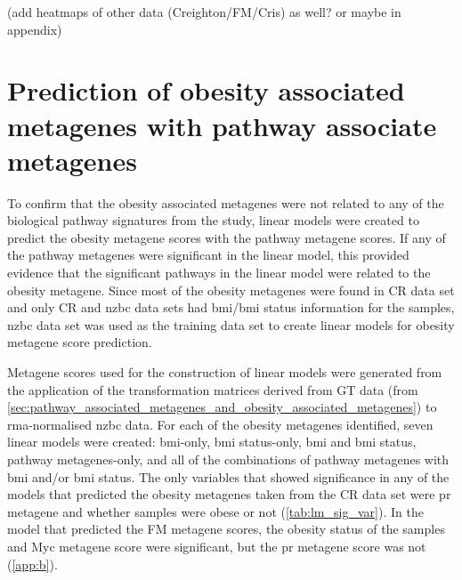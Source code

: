 (add heatmaps of other data (Creighton/FM/Cris) as well? or maybe in appendix)

\section{Prediction of obesity associated metagenes with pathway associate metagenes}
\label{sec:prediction_of_obesity_associated_metagene_with_pathway_associate_metagene}


To confirm that the obesity associated metagenes were not related to any of the biological pathway signatures from the \citet{Gatza2010a} study, linear models were created to predict the obesity metagene scores with the pathway metagene scores.
If any of the pathway metagenes were significant in the linear model, this provided evidence that the significant pathways in the linear model were related to the obesity metagene.
Since most of the obesity metagenes were found in CR data set and only CR and \gls{nzbc} data sets had \gls{bmi}/\gls{bmi} status information for the samples, \gls{nzbc} data set was used as the training data set to create linear models for obesity metagene score prediction.

Metagene scores used for the construction of linear models were generated from the application of the transformation matrices derived from GT data (from \cref{sec:pathway_associated_metagenes_and_obesity_associated_metagenes}) to \gls{rma}-normalised \gls{nzbc} data.
For each of the obesity metagenes identified, seven linear models were created: \gls{bmi}-only, \gls{bmi} status-only, \gls{bmi} and \gls{bmi} status, pathway metagenes-only, and all of the combinations of pathway metagenes with \gls{bmi} and/or \gls{bmi} status.
The only variables that showed significance in any of the models that predicted the obesity metagenes taken from the CR data set were \gls{pr} metagene and whether samples were obese or not (\cref{tab:lm_sig_var}).
In the model that predicted the FM metagene scores, the obesity status of the samples and Myc metagene score were significant, but the \gls{pr} metagene score was not (\cref{app:b}).

